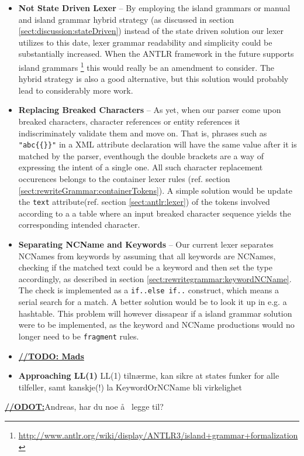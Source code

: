 \begin{itemize}

\item \textbf{Not State Driven Lexer} -- By employing the island grammars or manual and island grammar hybrid strategy (as discussed in section \ref{sect:discussion:stateDriven}) instead of the state driven solution our lexer utilizes to this date, lexer grammar readability and simplicity could be substantially increased. When the ANTLR framework in the future supports island grammars \footnote{\url{http://www.antlr.org/wiki/display/ANTLR3/island+grammar+formalization}} this would really be an amendment to consider. The hybrid strategy is also a good alternative, but this solution would probably lead to considerably more work.

\item \textbf{Replacing Breaked Characters} -- As yet, when our parser come upon breaked characters, character references or entity references it indiscriminately validate them and move on. That is, phrases such as \verb!"abc{{}}"! in a XML attribute declaration will have the same value after it is matched by the parser, eventhough the double brackets are a way of expressing the intent of a single one. All such character replacement occurences belongs to the container lexer rules (ref. section \ref{sect:rewriteGrammar:containerTokens}). A simple solution would be update the \verb!text! attribute(ref. section \ref{sect:antlr:lexer}) of the tokens involved according to a a table where an input breaked character sequence yields the corresponding intended character.

\item \textbf{Separating NCName and Keywords} -- Our current lexer separates NCNames from keywords by assuming that all keywords are NCNames, checking if the matched text could be a keyword and then set the type accordingly, as described in section \ref{sect:rewritegrammar:keywordNCName}. The check is implemented as a \verb!if..else if..! construct, which means a serial search for a match. A better solution would be to look it up in e.g. a hashtable. This problem will however dissapear if a island grammar solution were to be implemented, as the keyword and NCName productions would no longer need to be \verb!fragment! rules.

\item \underline{\textbf{\LARGE //TODO: Mads}} 

\item \textbf{Approaching LL(1)} LL(1) tiln\ae rme, kan sikre at states funker for alle tilfeller, samt kanskje(!) la KeywordOrNCName bli virkelighet

\end{itemize}

\underline{\textbf{\LARGE //ODOT:}}Andreas, har du noe \aa~ legge til?





